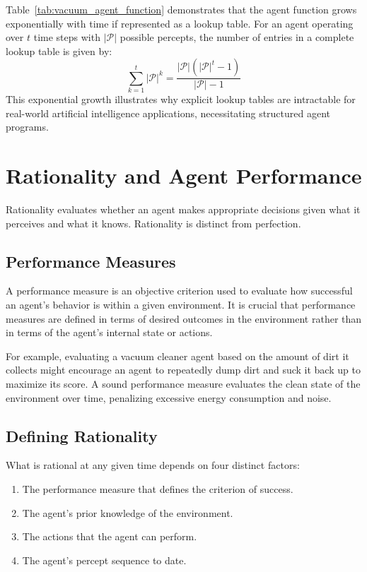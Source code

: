 \documentclass[12pt]{report}
\begin{document}
Table~\ref{tab:vacuum_agent_function} demonstrates that the agent function grows exponentially with time if represented as a lookup table. For an agent operating over $t$ time steps with $|\mathcal{P}|$ possible percepts, the number of entries in a complete lookup table is given by:
\begin{equation}
\sum_{k=1}^{t} |\mathcal{P}|^k = \frac{|\mathcal{P}|(|\mathcal{P}|^t - 1)}{|\mathcal{P}| - 1}
\end{equation}
This exponential growth illustrates why explicit lookup tables are intractable for real-world artificial intelligence applications, necessitating structured agent programs.

\section{Rationality and Agent Performance}

Rationality evaluates whether an agent makes appropriate decisions given what it perceives and what it knows. Rationality is distinct from perfection.

\subsection{Performance Measures}

A performance measure is an objective criterion used to evaluate how successful an agent's behavior is within a given environment. It is crucial that performance measures are defined in terms of desired outcomes in the environment rather than in terms of the agent's internal state or actions.

For example, evaluating a vacuum cleaner agent based on the amount of dirt it collects might encourage an agent to repeatedly dump dirt and suck it back up to maximize its score. A sound performance measure evaluates the clean state of the environment over time, penalizing excessive energy consumption and noise.

\subsection{Defining Rationality}

What is rational at any given time depends on four distinct factors:
\begin{enumerate}
    \item The performance measure that defines the criterion of success.
    \item The agent's prior knowledge of the environment.
    \item The actions that the agent can perform.
    \item The agent's percept sequence to date.
\end{enumerate}
\end{document}
